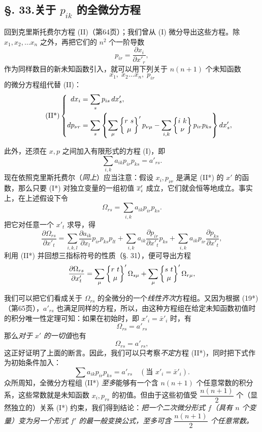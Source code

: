 \subsection*{\S. 33.\quad 关于 \(p_{ik}\) 的全微分方程}
回到克里斯托费尔方程 (II)（第64页）；我们曾从 (I) 微分导出这些方程。除 \(x_1,x_2,\ldots x_n\) 之外，再把它们的 \(n^2\) 个一阶导数
\[
p_{ir}=\frac{\partial x_i}{\partial x'_r},
\]
作为同样数目的新未知函数引入，就可以用下列关于 \(n(n+1)\) 个未知函数
\[
x_1,\;x_2\ldots x_n,\;p_{ir}
\]
的微分方程组代替 (II)：
\begin{equation}\tag{II*}
\left\{
\begin{aligned}
dx_i&=\sum_s p_{is}\,dx'_s,\\
dp_{\nu r}&=\sum_s\left\{\sum_\mu\left\{\begin{matrix}r\ s\\ \mu\end{matrix}\right\}'p_{\nu\mu}-\sum_{i,k}\left\{\begin{matrix}i\ k\\ \nu\end{matrix}\right\}p_{ir}p_{ks}\right\}dx'_s,
\end{aligned}
\right.
\end{equation}


此外，还须在 \(x,p\) 之间加入有限形式的方程 (I)，即
\begin{equation}\tag{I*}
\sum_{i,k}a_{ik}p_{ir}p_{ks}=a'_{rs}.
\end{equation}
现在依照克里斯托费尔（\emph{同上}）应当注意：假设 \(x_i,p_{\nu r}\) 是满足 (II*) 的 \(x'\) 的函数，那么只要 (I*) 对独立变量的一组初值 \(\overline{x}'_i\) 成立，它们就会恒等地成立。事实上，在上述假设下令
\[
\Omega_{rs}=\sum_{i,k}a_{ik}p_{ir}p_{ks}.
\]
把它对任意一个 \(x'_t\) 求导，得
\[
\frac{\partial\Omega_{rs}}{\partial x'_t}=\sum_{i,k,l}\frac{\partial a_{ik}}{\partial x_l}p_{ir}p_{ks}p_{lt}+\sum_{i,k}a_{ik}\frac{\partial p_{ir}}{\partial x'_t}p_{ks}+\sum_{i,k}a_{ik}p_{ir}\frac{\partial p_{ks}}{\partial x'_t},
\]
利用 (II*) 并回想三指标符号的性质（§. 31），便可导出方程
\[
\frac{\partial\Omega_{rs}}{\partial x'_t}=\sum_\mu\left\{\begin{matrix}r\ t\\ \mu\end{matrix}\right\}'\Omega_{s\mu}+\sum_\mu\left\{\begin{matrix}s\ t\\ \mu\end{matrix}\right\}'\Omega_{r\mu},
\]


我们可以把它们看成关于 $\Omega_{rs}$ 的全微分的一个\emph{线性齐次}方程组。又因为根据 (19*)（第65页），$a'_{rs}$ 也满足同样的方程，所以，由这种方程组在给定未知函数初值时的积分唯一性定理可知：如果在初始时，即 $x'_i=\bar x'_i$ 时，有
\[
\Omega_{rs}=a'_{rs}
\]
那么\emph{对于} $x'$ \emph{的一切值}也有
\[
\Omega_{rs}=a'_{rs},
\]
这正好证明了上面的断言。因此，我们可以只考察\emph{不定}方程 (II*)，同时把下式作为初始条件加入：
\[
\sum a_{ik}p_{ir}p_{ks}=a'_{rs}\quad (\text{当 }x'_i=\bar x'_i).
\]
众所周知，全微分方程组 (II*) \emph{至多}能够有一个含 $n(n+1)$ 个任意常数的积分系，这些常数就是未知函数 $x_i,p_{rs}$ 的初值。但由于这些初值受 $\dfrac{n(n+1)}{2}$ 个（显然独立的）关系 (I*) 约束，我们得到结论：\emph{把一个二次微分形式 $f$（具有 $n$ 个变量）变为另一个形式 $f'$ 的最一般变换公式，至多可含 $\dfrac{n(n+1)}{2}$ 个任意常数。}

